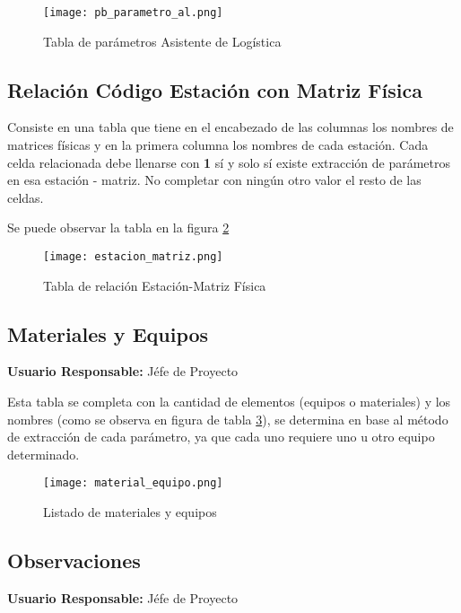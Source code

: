 \begin{figure}
	\centering
	\texttt{[image: pb\_parametro\_al.png]}
	\caption{Tabla de parámetros Asistente de Logística}
	\label{pb_parametro_al}
\end{figure}

\subsection{Relación Código Estación con Matriz Física} 

Consiste en una tabla que tiene en el encabezado de las columnas los nombres de matrices físicas y en la primera columna los nombres de cada estación. Cada celda relacionada debe llenarse con \textbf{1} sí y solo sí existe extracción de parámetros en esa estación - matriz. No completar con ningún otro valor el resto de las celdas.

Se puede observar la tabla en la figura \ref{estacion_matriz}

\begin{landscape}
\begin{figure}
	\centering
	\texttt{[image: estacion\_matriz.png]}
	\caption{Tabla de relación Estación-Matriz Física}
	\label{estacion_matriz}
\end{figure}
\end{landscape}

\subsection{Materiales y Equipos}

\textbf{Usuario Responsable:} Jéfe de Proyecto

Esta tabla se completa con la cantidad de elementos (equipos o materiales) y los nombres (como se observa en figura de tabla \ref{material_equipo}), se determina en base al método de extracción de cada parámetro, ya que cada uno requiere uno u otro equipo determinado.

\begin{figure}
	\centering
	\texttt{[image: material\_equipo.png]}
	\caption{Listado de materiales y equipos}
	\label{material_equipo}
\end{figure}


\subsection{Observaciones}

\textbf{Usuario Responsable:} Jéfe de Proyecto

